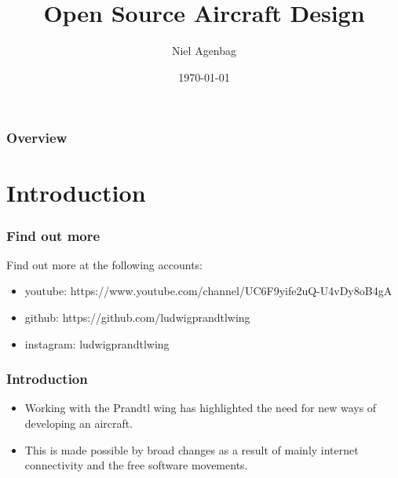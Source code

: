 \documentclass{beamer}
\title[Open Aircraft Design]{Open Source Aircraft Design} %
\author{Niel Agenbag} %
\institute[Unaffiliated] %
{
Unaffiliated \\ %
\medskip
\textit{Ludwigprandtlwing@gmail.com} %
}
\date{\today} %
\begin{document}
\begin{frame}
\titlepage %
\end{frame}

\begin{frame}
\frametitle{Overview} %
\tableofcontents %
\end{frame}


\section{Introduction}


\begin{frame}
\frametitle{Find out more}

Find out more at the following accounts:

\begin{itemize}
\item youtube:  https://www.youtube.com/channel/UC6F9yife2uQ-U4vDy8oB4gA
\item github:  https://github.com/ludwigprandtlwing
\item instagram:  ludwigprandtlwing
\end{itemize}
\end{frame}


\begin{frame}
\frametitle{Introduction}

\begin{itemize}
\item Working with the Prandtl wing has highlighted the need for new ways of developing an aircraft.
\item This is made possible by broad changes as a result of mainly internet connectivity and the free software movements.
\end{itemize}

\end{frame}
\end{document}
